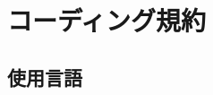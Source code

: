 \documentclass[12pt,a4paper]{jarticle}
\begin{document}



\newpage






\newpage



\newpage

\section{コーディング規約}
\label{sec:rules}

\subsection{使用言語}
\end{document}
